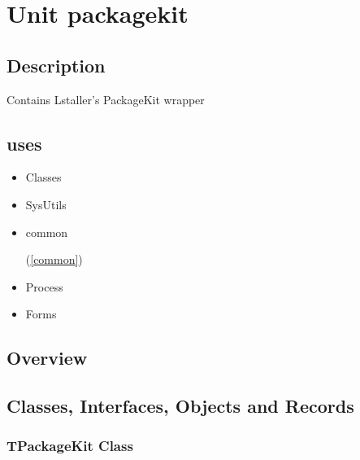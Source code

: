 \documentclass{report}
\newif\ifpdf
\begin{document}
\chapter{Unit packagekit}
\label{packagekit}
\section{Description}
Contains Lstaller's PackageKit wrapper
\section{uses}
\begin{itemize}
\item \begin{ttfamily}Classes\end{ttfamily}\item \begin{ttfamily}SysUtils\end{ttfamily}\item \begin{ttfamily}common\end{ttfamily}(\ref{common})\item \begin{ttfamily}Process\end{ttfamily}\item \begin{ttfamily}Forms\end{ttfamily}\end{itemize}
\section{Overview}
\begin{description}
\item[\texttt{\begin{ttfamily}TPackageKit\end{ttfamily} Class}]
\end{description}
\section{Classes, Interfaces, Objects and Records}
\ifpdf
\subsection*{\large{\textbf{TPackageKit Class}}\normalsize\hspace{1ex}\hrulefill}
\else
\subsection*{TPackageKit Class}
\fi
\label{packagekit.TPackageKit}
\end{document}
